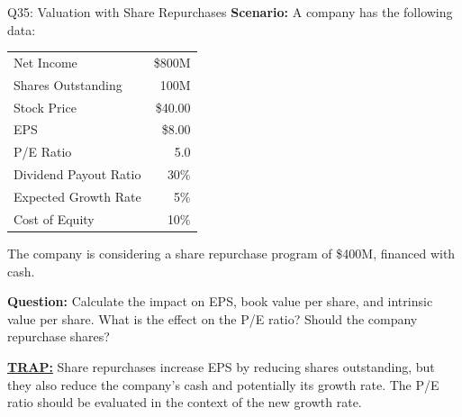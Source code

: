 \documentclass{beamer}
\renewcommand{\scriptsize}{\fontsize{6pt}{7pt}\selectfont}
\begin{document}
	\begin{frame}{Q35: Valuation with Share Repurchases}
		\scriptsize
		\textbf{Scenario:} A company has the following data:
		
		\begin{tabular}{lr}
			Net Income & \$800M \\
			Shares Outstanding & 100M \\
			Stock Price & \$40.00 \\
			EPS & \$8.00 \\
			P/E Ratio & 5.0 \\
			Dividend Payout Ratio & 30\% \\
			Expected Growth Rate & 5\% \\
			Cost of Equity & 10\% \\
		\end{tabular}
		
		The company is considering a share repurchase program of \$400M, financed with cash.
		
		\textbf{Question:} Calculate the impact on EPS, book value per share, and intrinsic value per share. What is the effect on the P/E ratio? Should the company repurchase shares?
		
		\vspace{2pt}
		\underline{\textbf{TRAP:}} Share repurchases increase EPS by reducing shares outstanding, but they also reduce the company's cash and potentially its growth rate. The P/E ratio should be evaluated in the context of the new growth rate.
	\end{frame}
	
\end{document}
